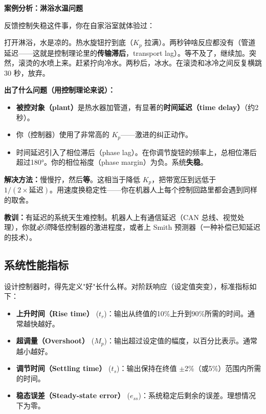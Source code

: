 \vspace{0.5em}
\begin{mdframed}[linewidth=1pt, innertopmargin=10pt, innerbottommargin=10pt]
\textbf{案例分析：淋浴水温问题}

\vspace{0.3em}
反馈控制失稳这件事，你在自家浴室就体验过：

打开淋浴，水是凉的。热水旋钮拧到底（$K_p$ 拉满）。两秒钟啥反应都没有（管道延迟——这就是控制理论里的\textbf{传输滞后}，transport lag）。等不及了，继续加。突然，滚烫的水喷上来。赶紧拧向冷水。两秒后，冰水。在滚烫和冰冷之间反复横跳 30 秒，放弃。

\textbf{出了什么问题（用控制理论来说）：}
\begin{itemize}[nosep]
    \item \textbf{被控对象（plant）}是热水器加管道，有显著的\textbf{时间延迟（time delay）}（约2秒）。
    \item 你（控制器）使用了非常高的 $K_p$——激进的纠正动作。
    \item 时间延迟引入了相位滞后（phase lag）。在你调节旋钮的频率上，总相位滞后超过180°。你的相位裕度（phase margin）为负。系统\textbf{失稳}。
\end{itemize}

\textbf{解决方法：}慢慢拧，然后\textbf{等}。这相当于降低 $K_p$，把带宽压到远低于 $1/(2 \times \text{延迟})$。用速度换稳定性——你在机器人上每个控制回路里都会遇到同样的取舍。

\textbf{教训：}有延迟的系统天生难控制。机器人上有通信延迟（CAN 总线、视觉处理），你就\textit{必须}降低控制器的激进程度，或者上 Smith 预测器（一种补偿已知延迟的技术）。
\end{mdframed}

\subsection{系统性能指标}

设计控制器时，得先定义"好"长什么样。对阶跃响应（设定值突变），标准指标如下：

\begin{itemize}
    \item \textbf{上升时间（Rise time）} ($t_r$)：输出从终值的10\%上升到90\%所需的时间。通常越快越好。
    \item \textbf{超调量（Overshoot）} ($M_p$)：输出超过设定值的幅度，以百分比表示。通常越小越好。
    \item \textbf{调节时间（Settling time）} ($t_s$)：输出保持在终值 $\pm$2\%（或5\%）范围内所需的时间。
    \item \textbf{稳态误差（Steady-state error）} ($e_{ss}$)：系统稳定后剩余的误差。理想情况下为零。
\end{itemize}

